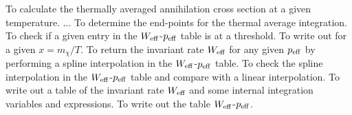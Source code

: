 \begin{brief-subs}
  To calculate the thermally averaged annihilation
  cross section at a given temperature.
  ...
  To determine the end-points for the thermal
  average integration.
  To check if a given entry in the $W_{\rm
  eff}$-$p_{\rm eff}$ table is at a threshold.
  To write out  for a given $x=m_\chi/T$.
  To return the invariant rate $W_{\rm eff}$ for any
  given $p_{\rm eff}$ by performing a spline interpolation in the
  $W_{\rm eff}$-$p_{\rm eff}$ table.
  To check the spline interpolation in the $W_{\rm
  eff}$-$p_{\rm eff}$ table and compare with a linear interpolation.
  To write out a table of the invariant rate $W_{\rm
  eff}$ and some internal integration variables and expressions.
  To write out the table $W_{\rm eff}$-$p_{\rm eff}$.
\end{brief-subs}
